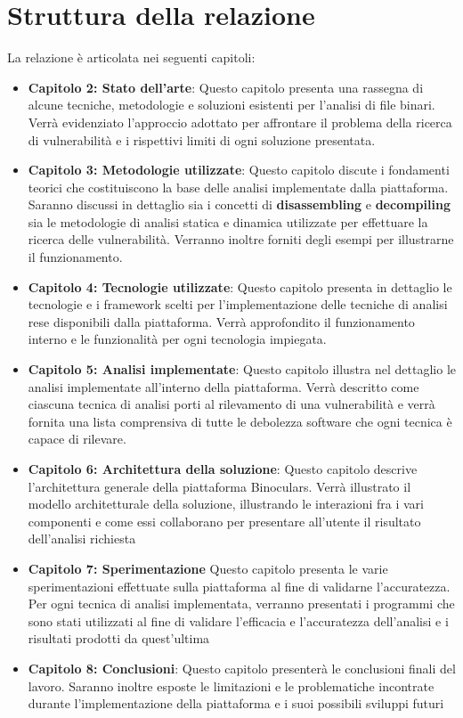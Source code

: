 \documentclass[../main.tex]{subfiles}
\begin{document}
\section{Struttura della relazione}
La relazione è articolata nei seguenti capitoli:
\begin{itemize}
    \item \textbf{Capitolo 2: Stato dell'arte}: Questo capitolo presenta una rassegna di alcune tecniche, metodologie e soluzioni esistenti per l'analisi di file binari. Verrà evidenziato l'approccio adottato per affrontare il problema della ricerca di vulnerabilità e i
    rispettivi limiti di ogni soluzione presentata.
    \item \textbf{Capitolo 3: Metodologie utilizzate}: Questo capitolo discute i fondamenti teorici che costituiscono la base delle analisi implementate dalla piattaforma. Saranno discussi in dettaglio sia i concetti di \textbf{disassembling} e \textbf{decompiling} sia
    le metodologie di analisi statica e dinamica utilizzate per effettuare la ricerca delle vulnerabilità. Verranno inoltre forniti degli esempi per illustrarne il funzionamento.
    \item \textbf{Capitolo 4: Tecnologie utilizzate}: Questo capitolo presenta in dettaglio le tecnologie e i framework scelti per l'implementazione delle tecniche di analisi rese disponibili dalla piattaforma. Verrà approfondito il funzionamento interno e le funzionalità per ogni tecnologia impiegata.
    \item \textbf{Capitolo 5: Analisi implementate}: Questo capitolo illustra nel dettaglio le analisi implementate all'interno della piattaforma. Verrà descritto come ciascuna tecnica di analisi porti al rilevamento di una vulnerabilità e verrà fornita una lista comprensiva di tutte le debolezza software che ogni tecnica è capace di rilevare.
    \item \textbf{Capitolo 6: Architettura della soluzione}: Questo capitolo descrive l'architettura generale della piattaforma Binoculars. Verrà illustrato il modello architetturale della soluzione, illustrando le interazioni fra i vari componenti e come essi collaborano per presentare all'utente il risultato dell'analisi richiesta    
    \item \textbf{Capitolo 7: Sperimentazione} Questo capitolo presenta le varie sperimentazioni effettuate sulla piattaforma al fine di validarne l'accuratezza. Per ogni tecnica di analisi implementata, verranno presentati i programmi che sono stati utilizzati al fine di validare l'efficacia e l'accuratezza dell'analisi e i risultati prodotti da quest'ultima 
    \item \textbf{Capitolo 8: Conclusioni}: Questo capitolo presenterà le conclusioni finali del lavoro. Saranno inoltre esposte le limitazioni e le problematiche incontrate durante l'implementazione della piattaforma e i suoi possibili sviluppi futuri
\end{itemize}
\end{document}
